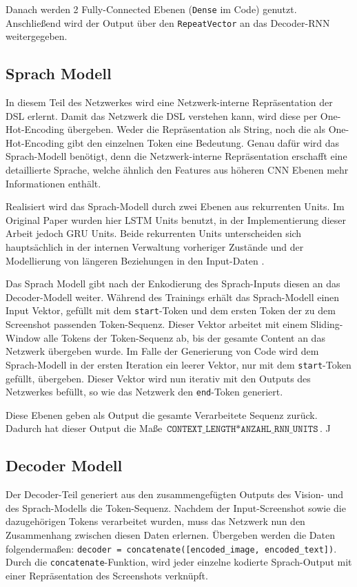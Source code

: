 \documentclass[pdftex,a4paper,halfparskip, article]{scrartcl}
\begin{document}
Danach werden 2 Fully-Connected Ebenen (\texttt{Dense} im Code) genutzt. Anschließend wird der Output über den \texttt{RepeatVector} an das Decoder-RNN weitergegeben.

\subsection{Sprach Modell}

In diesem Teil des Netzwerkes wird eine Netzwerk-interne Repräsentation der DSL erlernt. Damit das Netzwerk die DSL verstehen kann, wird diese per One-Hot-Encoding übergeben. Weder die Repräsentation als String, noch die als One-Hot-Encoding gibt den einzelnen Token eine Bedeutung. Genau dafür wird das Sprach-Modell benötigt, denn die Netzwerk-interne Repräsentation erschafft eine detaillierte Sprache, welche ähnlich den Features aus höheren CNN Ebenen mehr Informationen enthält. 

Realisiert wird das Sprach-Modell durch zwei Ebenen aus rekurrenten Units. Im Original Paper wurden hier LSTM Units benutzt, in der Implementierung dieser Arbeit jedoch GRU Units. Beide rekurrenten Units unterscheiden sich hauptsächlich in der internen Verwaltung vorheriger Zustände und der Modellierung von längeren Beziehungen in den Input-Daten \cite{colahsBlogLSTM}. 

Das Sprach Modell gibt nach der Enkodierung des Sprach-Inputs diesen an das Decoder-Modell weiter. Während des Trainings erhält das Sprach-Modell einen Input Vektor, gefüllt mit dem \texttt{start}-Token und dem ersten Token der zu dem Screenshot passenden Token-Sequenz. Dieser Vektor arbeitet mit einem Sliding-Window alle Tokens der Token-Sequenz ab, bis der gesamte Content an das Netzwerk übergeben wurde. Im Falle der Generierung von Code wird dem Sprach-Modell in der ersten Iteration ein leerer Vektor, nur mit dem \texttt{start}-Token gefüllt, übergeben. Dieser Vektor wird nun iterativ mit den Outputs des Netzwerkes befüllt, so wie das Netzwerk den \texttt{end}-Token generiert.

Diese Ebenen geben als Output die gesamte Verarbeitete Sequenz zurück. Dadurch hat dieser Output die Maße $\texttt{CONTEXT\_LENGTH} * \texttt{ANZAHL\_RNN\_UNITS}$. J


\subsection{Decoder Modell}


Der Decoder-Teil generiert aus den zusammengefügten Outputs des Vision- und des Sprach-Modells die Token-Sequenz. Nachdem der Input-Screenshot sowie die dazugehörigen Tokens verarbeitet wurden, muss das Netzwerk nun den Zusammenhang zwischen diesen Daten erlernen. Übergeben werden die Daten folgendermaßen: \texttt{decoder = concatenate([encoded\_image, encoded\_text])}. Durch die \texttt{concatenate}-Funktion, wird jeder einzelne kodierte Sprach-Output mit einer Repräsentation des Screenshots verknüpft.  
\end{document}
